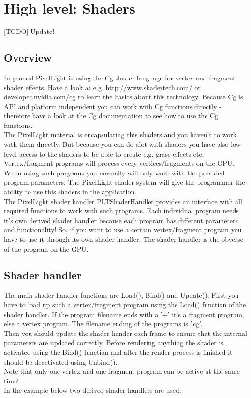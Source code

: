 \chapter{High level: Shaders}


[TODO] Update!



\section{Overview}
In general PixelLight is using the Cg shader language for vertex and fragment shader effects. Have 
a look at e.g. \url{http://www.shadertech.com/} or developer.nvidia.com/cg to learn the basics
about this technology. Because Cg is API and platform independent you can work with Cg functions
directly - therefore have a look at the Cg documentation to see how to use the Cg functions.\\
The PixelLight material is encapsulating this shaders and you haven't to work with them directly. But
because you can do alot with shaders you have also low level access to the shaders to be able
to create e.g. grass effects etc.\\

Vertex/fragment programs will process every vertices/fragments on the GPU. When using such programs
you normally will only work with the provided program parameters. The PixelLight shader system will give the
programmer the ability to use this shaders in the application.\\
The PixelLight shader handler PLTShaderHandler provides an interface with all required functions to work with
such programs. Each individual program needs it's own derived shader handler because each program has
different parameters and functionality! So, if you want to use a certain vertex/fragment program you
have to use it through its own shader handler. The shader handler is the obverse of the program on the GPU.




\section{Shader handler}
The main shader handler functions are Load(), Bind() and Update(). First you have to load up such
a vertex/fragment program using the Load() function of the shader handler. If the program filename
ends with a '+' it's a fragment program, else a vertex program. The filename ending of the programs
is '.cg'.\\
Then you should update the shader hander each frame to ensure that the internal parameters are
updated correctly. Before rendering anything the shader is activated using the Bind() function and
after the render process is finished it should be deactivated using Unbind().\\
Note that only one vertex and one fragment program can be active at the same time!\\
In the example below two derived shader handlers are used:\\

